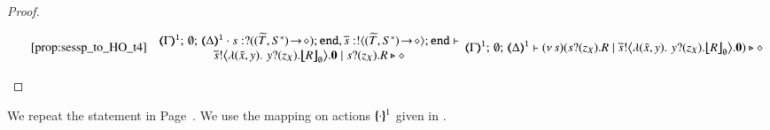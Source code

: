 \begin{proof}
\begin{enumerate}[1.]
\[{{\begin{array}{rclc}
						& \eqref{prop:sessp_to_HO_t4}
					\end{array}
				}{
				\begin{array}{c}
					\tmap{\Gamma}{1};\, \es;\, \tmap{\Delta}{1}
					\cat s:\btinp{\shot{(\widetilde{T},S^*)}}\tinact , \dual{s}:\btout{\shot{(\widetilde{T},S^*)}}\tinact
					\proves
					\\
					\bbout{\dual{s}}{\abs{(\tilde{x}, y )} \,{\binp{y}{z_X} \auxmapp{R}{{}}{\es}}} \inact 
					\Par 
					\binp{s}{z_X} R 
					\hastype \Proc
					\end{array}
				}
			}{
				\tmap{\Gamma}{1};\, \es;\, \tmap{\Delta}{1} 
				\proves
				\newsp{s}{\binp{s}{z_X} R \Par 
				\bbout{\dual{s}}{\abs{(\tilde{x},y) } \,{\binp{y}{z_X} \auxmapp{R}{{}}{\es}}} \inact} \hastype \Proc
			}
			\]
	\end{enumerate}
\end{proof}







We repeat the statement in Page~\pageref{prop:op_corr_HOp_to_HO}.
We use the mapping on actions $\{\!\!\{\cdot\}\!\!\}^{1}$ given in .

\begin{proposition}\rm
	\label{app:prop:op_corr_HOp_to_HO}
	
\end{proposition}



